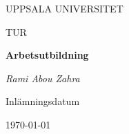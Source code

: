 \begin{titlepage}

  \centering
	{\scshape\LARGE UPPSALA UNIVERSITET\par}
	\vspace{1cm}
  {\scshape\Large {TUR} \par}
	\vspace{1.5cm}
  {\huge\bfseries {Arbetsutbildning} \par}
	\vspace{2cm}
	{\Large\itshape Rami Abou Zahra \par}
	\vfill
  \vfill


  {\large Inlämningsdatum}\par
  {\today}

\end{titlepage}
